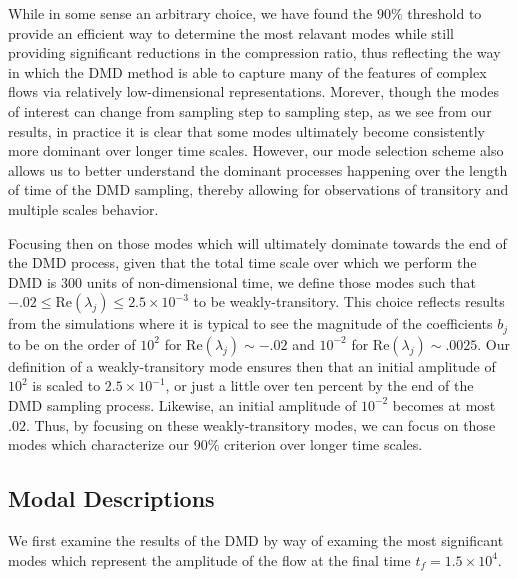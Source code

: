 \documentclass[aps,prl,preprint,groupedaddress]{revtex4-1}
\begin{document}
While in some sense an arbitrary choice, we have found the $90\%$ threshold to provide an efficient way to determine the most relavant modes while still providing significant reductions in the compression ratio, thus reflecting the way in which the DMD method is able to capture many of the features of complex flows via relatively low-dimensional representations.  
Morever, though the modes of interest can change from sampling step to sampling step, as we see from our results, in practice it is clear that some modes ultimately become consistently more dominant over longer time scales.  However, our mode selection scheme also allows us to better understand the dominant processes happening over the length of time of the DMD sampling, thereby allowing for observations of transitory and multiple scales behavior.  

Focusing then on those modes which will ultimately dominate towards the end of the DMD process, given that the total time scale over which we perform the DMD is $300$ units of non-dimensional time, we define those modes such that $-.02\leq \mbox{Re}\left(\lambda_{j}\right)\leq 2.5\times 10^{-3}$ to be weakly-transitory.  This choice reflects results from the simulations where it is typical to see the magnitude of the coefficients $b_{j}$ to be on the order of $10^{2}$ for $\mbox{Re}\left(\lambda_{j}\right)\sim -.02$ and $10^{-2}$ for $\mbox{Re}\left(\lambda_{j}\right)\sim .0025$.  Our definition of a weakly-transitory mode ensures then that an initial amplitude of $10^{2}$ is scaled to $2.5\times 10^{-1}$, or just a little over ten percent by the end of the DMD sampling process.  Likewise, an initial amplitude of $10^{-2}$ becomes at most $.02$.  Thus, by focusing on these weakly-transitory modes, we can focus on those modes which characterize our 90\% criterion over longer time scales.  
\subsection*{Modal Descriptions}
We first examine the results of the DMD by way of examing the most significant modes which represent the amplitude of the flow at the final time $t_{f}=1.5\times10^{4}$.  
\end{document}
